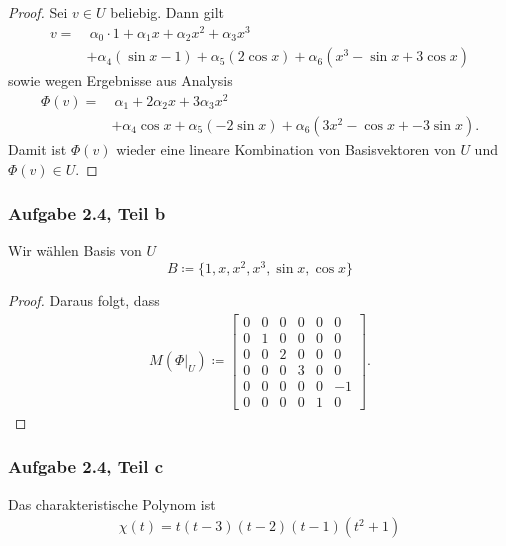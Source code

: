 \documentclass[draft,a5paper]{article}
\theoremstyle{remark}
\begin{document}
\begin{proof}
  Sei \(v \in U\) beliebig.  Dann gilt
  \begin{align*}
    v = &~ \alpha_{0} \cdot 1 + \alpha_{1} x + \alpha_{2} x^{2} + \alpha_{3} x^{3} \\
        &+ \alpha_{4} (\sin  x - 1) + \alpha_{5} (2 \cos x) + \alpha_{6} (x^{3} -
          \sin x + 3 \cos x)
  \end{align*}
  sowie wegen Ergebnisse aus Analysis
  \begin{align*}
    \Phi(v) = &~ \alpha_{1} + 2 \alpha_{2} x + 3 \alpha_{3} x^{2} \\
           &+ \alpha_{4} \cos x + \alpha_{5}  (-2 \sin x) + \alpha_{6} (3x^{2} - \cos
             x + -3 \sin x).
  \end{align*}
  Damit ist \(\Phi(v)\) wieder eine lineare Kombination von Basisvektoren
  von \(U\) und \(\Phi(v) \in U\).
\end{proof}
\subsubsection{Aufgabe 2.4, Teil b}
Wir wählen Basis von \(U\)
\[B \coloneq \{1, x, x^{2}, x^{3}, \sin x, \cos x\}\]
\begin{proof}
  Daraus folgt, dass
  \begin{align*}
    M(\Phi\vert_{U}) \coloneq
    \begin{bmatrix}
      0 & 0 & 0 & 0 & 0 & 0\\
      0 & 1 & 0 & 0 & 0 & 0 \\
      0 & 0 & 2 & 0 & 0 & 0\\
      0 & 0 & 0 & 3 & 0 & 0\\
      0 & 0 & 0 & 0 & 0 & -1 \\
      0 & 0 & 0 & 0 & 1 &  0
    \end{bmatrix}.
  \end{align*}
\end{proof}
\subsubsection{Aufgabe 2.4, Teil c}
Das charakteristische Polynom ist
\begin{align*}
  \chi(t) = t(t-3)(t-2)(t-1)(t^{2}+1)
\end{align*}
\end{document}
